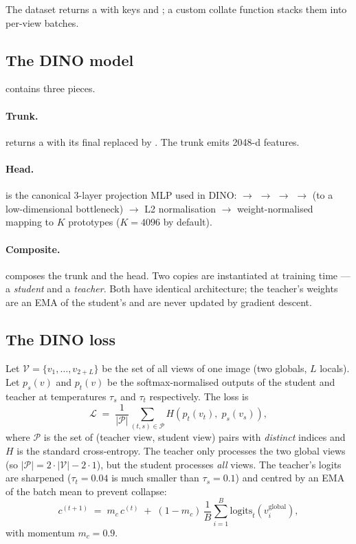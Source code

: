 The dataset returns a  with keys  and
; a custom collate function stacks them into per-view
batches.

\subsection{The DINO model}
\label{sec:phase3dino:model}

 contains three pieces.

\paragraph{Trunk.}  returns a
 with its final 
replaced by . The trunk emits 2048-d features.

\paragraph{Head.}  is the canonical 3-layer projection
MLP used in DINO:  $\to$  $\to$ 
$\to$  $\to$  (to a low-dimensional bottleneck)
$\to$ L2 normalisation $\to$ weight-normalised  mapping to
\(K\) prototypes (\(K=4096\) by default).

\paragraph{Composite.}  composes the trunk and the head.
Two copies are instantiated at training time --- a \emph{student} and a
\emph{teacher}. Both have identical architecture; the teacher's weights
are an EMA of the student's and are never updated by gradient descent.

\subsection{The DINO loss}
\label{sec:phase3dino:loss}

Let \(\mathcal{V} = \{v_1, \ldots, v_{2+L}\}\) be the set of all views
of one image (two globals, \(L\) locals). Let \(p_s(v)\) and \(p_t(v)\)
be the softmax-normalised outputs of the student and teacher at
temperatures \(\tau_s\) and \(\tau_t\) respectively. The loss is
\[
\mathcal{L} \;=\;
\frac{1}{|\mathcal{P}|}\!\!\sum_{(t, s)\in \mathcal{P}}\!\!
H\!\left( p_t(v_t),\; p_s(v_s) \right),
\]
where \(\mathcal{P}\) is the set of (teacher view, student view) pairs
with \emph{distinct} indices and \(H\) is the standard cross-entropy.
The teacher only processes the two global views (so
\(|\mathcal{P}| = 2 \cdot |\mathcal{V}| - 2 \cdot 1\)), but the student
processes \emph{all} views. The teacher's logits are sharpened
(\(\tau_t = 0.04\) is much smaller than \(\tau_s = 0.1\)) and centred by
an EMA of the batch mean to prevent collapse:
\[
c^{(t+1)} \;=\; m_c\, c^{(t)} \;+\;
(1 - m_c)\, \frac{1}{B}\sum_{i=1}^{B}\mathrm{logits}_t(v_i^{\mathrm{global}}),
\]
with momentum \(m_c = 0.9\).

